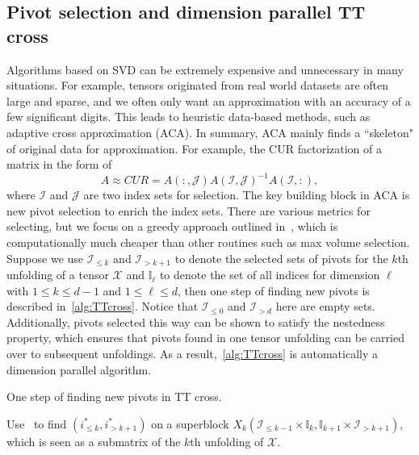 \documentclass[11pt,a4paper,review]{siamart220329}
\begin{document}
\subsection{Pivot selection and dimension parallel TT cross}
Algorithms based on SVD can be extremely expensive and unnecessary in many situations. For example, tensors originated from real world datasets are often large and sparse, and we often only want an approximation with an accuracy of a few significant digits. This leads to heuristic data-based methods, such as adaptive cross approximation (ACA). In summary, ACA mainly finds a ``skeleton" of original data for approximation. For example, the CUR factorization of a matrix in the form of
\[ A \approx CUR = A(:,\mathcal{J})A(\mathcal{I},\mathcal{J})^{-1}A(\mathcal{I},:), \]
where $\mathcal{I}$ and $\mathcal{J}$ are two index sets for selection. The key building block in ACA is new pivot selection to enrich the index sets. There are various metrics for selecting, but we focus on a greedy approach outlined in~\cite[Algorithm 2]{dolgov2020parallel}, which is computationally much cheaper than other routines such as max volume selection. Suppose we use $\mathcal{I}_{\le k}$ and $\mathcal{I}_{>k+1}$ to denote the selected sets of pivots for the $k$th unfolding of a tensor $\mathcal{X}$ and $\mathbb{I}_\ell$ to denote the set of all indices for dimension $\ell$ with $1 \le k \le d-1$ and $1 \le \ell \le d$, then one step of finding new pivots is described in~\cref{alg:TTcross}. Notice that $\mathcal{I}_{\le 0}$ and $\mathcal{I}_{>d}$ here are empty sets. Additionally, pivots selected this way can be shown to satisfy the nestedness property, which ensures that pivots found in one tensor unfolding can be carried over to subsequent unfoldings. As a result,~\cref{alg:TTcross} is automatically a dimension parallel algorithm.

\begin{algorithm}
\caption{One step of finding new pivots in TT cross.}
\begin{algorithmic}[1]
\label{alg:TTcross}
\State Use~\cite[Algorithm 2]{dolgov2020parallel} to find $(i^*_{\le k}, i^*_{>k+1})$ on a superblock $X_k(\mathcal{I}_{\le k-1}\times\mathbb{I}_k,\mathbb{I}_{k+1}\times \mathcal{I}_{> k+1})$, which is seen as a submatrix of the $k$th unfolding of $\mathcal{X}$.
\EndFor
\end{algorithmic}
\end{algorithm}
\end{document}
